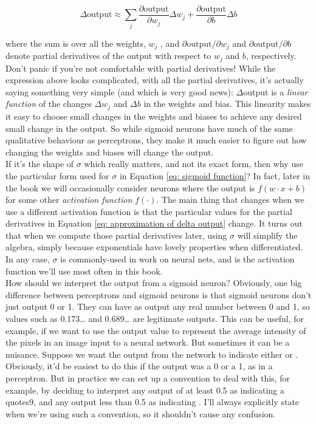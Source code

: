 \begin{equation}
\Delta \text{output}\approx\sum_j \frac{\partial \text{output}}{\partial w_j}\Delta w_j+\frac{\partial \text{output}}{\partial b}\Delta b
\label{eq: approximation of delta output}
\end{equation}

where the sum is over all the weights, $w_j$ , and $\partial \text{output}/\partial w_j$ and $\partial \text{output}/\partial b$ denote partial derivatives of the output with respect to $w_j$ and $b$, respectively. Don't panic if you're not comfortable with partial derivatives! While the expression above looks complicated, with all the partial derivatives, it's actually saying something very simple (and which is very good news): $\Delta$output is a \textit{linear function} of the changes $\Delta w_j$ and $\Delta b$ in the weights and bias. This linearity makes it easy to choose small changes in the weights and biases to achieve any desired small change in the output. So while sigmoid neurons have much of the same qualitative behaviour as perceptrons, they make it much easier to figure out how changing the weights and biases will change the output.\\

If it's the shape of $\sigma$ which really matters, and not its exact form, then why use the particular form used for $\sigma$ in Equation \ref{eq: sigmoid function}? In fact, later in the book we will occasionally consider neurons where the output is $f(w\cdot x+b)$ for some other \textit{activation function} $f(\cdot)$. The main thing that changes when we use a different activation function is that the particular values for the partial derivatives in Equation \ref{eq: approximation of delta output} change. It turns out that when we compute those partial derivatives later, using $\sigma$ will simplify the algebra, simply because exponentials have lovely properties when differentiated. In any case, $\sigma$ is commonly-used in work on neural nets, and is the activation function we'll use most often in this book.\\

How should we interpret the output from a sigmoid neuron? Obviously, one big difference between perceptrons and sigmoid neurons is that sigmoid neurons don't just output 0 or 1. They can have as output any real number between 0 and 1, so values such as 0.173… and 0.689… are legitimate outputs. This can be useful, for example, if we want to use the output value to represent the average intensity of the pixels in an image input to a neural network. But sometimes it can be a nuisance. Suppose we want the output from the network to indicate either  or . Obviously, it'd be easiest to do this if the output was a 0 or a 1, as in a perceptron. But in practice we can set up a convention to deal with this, for example, by deciding to interpret any output of at least 0.5 as indicating a quotes{9}, and any output less than 0.5 as indicating . I'll always explicitly state when we're using such a convention, so it shouldn't cause any confusion.\\

